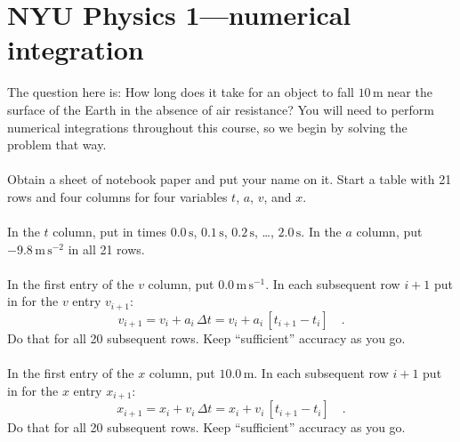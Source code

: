\documentclass[12pt]{article}
\begin{document}
\newcommand{\m}{\mathrm{m}}
\newcommand{\s}{\mathrm{s}}
\newcommand{\mps}{\m\,\s^{-1}}
\newcommand{\mpss}{\m\,\s^{-2}}
\thispagestyle{empty}

\section*{NYU Physics 1---numerical integration}

The question here is: How long does it take for an object to fall
$10\,\m$ near the surface of the Earth in the absence of air
resistance?  You will need to perform numerical integrations
throughout this course, so we begin by solving the problem that way.

\paragraph{\theproblem}%
Obtain a sheet of notebook paper and put your name on it.  Start a
table with 21 rows and four columns for four variables $t$, $a$, $v$,
and $x$.

\paragraph{\theproblem}%
In the $t$ column, put in times $0.0\,\s$, $0.1\,\s$, $0.2\,\s$,
\ldots, $2.0\,\s$.  In the $a$ column, put $-9.8\,\mpss$ in all 21
rows.

\paragraph{\theproblem}%
In the first entry of the $v$ column, put $0.0\,\mps$.  In each
subsequent row $i+1$ put in for the $v$ entry $v_{i+1}$:
\begin{equation}
v_{i+1}= v_i + a_i\,\Delta t = v_i + a_i\,\left[t_{i+1}-t_i\right] \quad .
\end{equation}
Do that for all 20 subsequent rows.  Keep ``sufficient'' accuracy as
you go.

\paragraph{\theproblem}%
In the first entry of the $x$ column, put $10.0\,\m$.  In each
subsequent row $i+1$ put in for the $x$ entry $x_{i+1}$:
\begin{equation}
x_{i+1}= x_i + v_i\,\Delta t = x_i + v_i\,\left[t_{i+1}-t_i\right] \quad .
\end{equation}
Do that for all 20 subsequent rows.  Keep ``sufficient'' accuracy as
you go.
\end{document}
